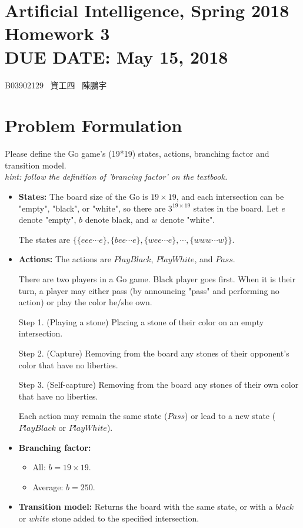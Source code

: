 \documentclass{article}
\newcommand{\hmwkClass}{Artificial Intelligence, Spring 2018}
\newcommand{\hmwkTitle}{Homework 3}
\newcommand{\hmwkDueDate}{May 15, 2018}
\newcommand{\tb}{\textbf}
\begin{document}
\thispagestyle{empty}
\section*{\hmwkClass \\
    \normalsize{\hmwkTitle} \\
    \normalsize{DUE DATE: \hmwkDueDate}
}

\hfill{B03902129 \, 資工四 \, 陳鵬宇}

\section{Problem Formulation}

Please define the Go game's (19*19) states, actions, branching factor and transition model. \\
\textit{hint: follow the definition of 'brancing factor' on the textbook.}

\begin{itemize}
    \item \tb{States:} The board size of the Go is $19 \times 19$, and each intersection can be "empty", "black", or "white", so there are $3^{19 \times 19}$ states in the board. Let $e$ denote "empty", $b$ denote black, and $w$ denote "white".

        The states are $\{\{eee \cdots e\}, \{bee \cdots e\}, \{wee \cdots e\}, \cdots, \{www \cdots w\}\}$.

    \item \tb{Actions:} 
    The actions are $PlayBlack$, $PlayWhite$, and $Pass$.

    There are two players in a Go game. Black player goes first. When it is their turn, a player may either pass (by announcing "pass" and performing no action) or play the color he/she own.
    
    Step 1. (Playing a stone) Placing a stone of their color on an empty intersection.

    Step 2. (Capture) Removing from the board any stones of their opponent's color that have no liberties.

    Step 3. (Self-capture) Removing from the board any stones of their own color that have no liberties.

    Each action may remain the same state ($Pass$) or lead to a new state ($PlayBlack$ or $PlayWhite$).

    \item \tb{Branching factor:} 
    \begin{itemize}
        \item All: $b = 19 \times 19$.
        \item Average: $b = 250$.
    \end{itemize}

    \item \tb{Transition model:} Returns the board with the same state, or with a $black$ or $white$ stone added to the specified intersection.

\end{itemize}
\end{document}
